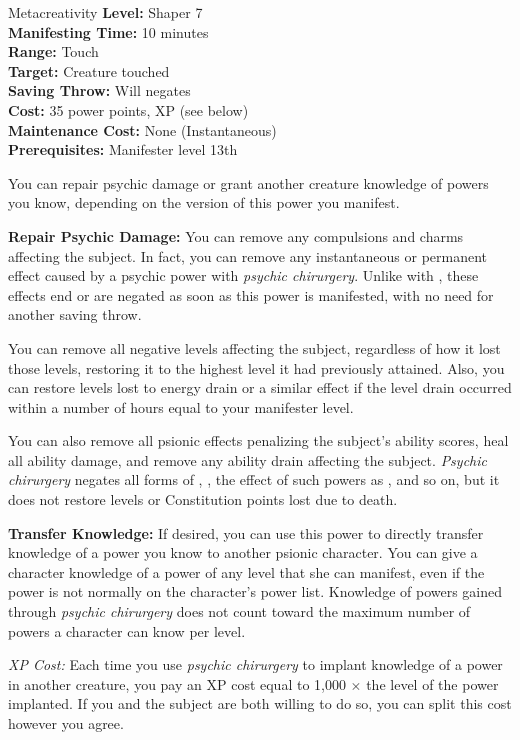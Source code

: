 {Metacreativity}
{
	\textbf{Level:}
	Shaper 7\\
	\textbf{Manifesting Time:}
	10 minutes\\
	\textbf{Range:}
	Touch\\
	\textbf{Target:}
	Creature touched\\
	\textbf{Saving Throw:}
	Will negates\\
	\textbf{Cost:}
	35 power points, XP (see below)\\
	\textbf{Maintenance Cost:}
	None (Instantaneous)\\
	\textbf{Prerequisites:}
	Manifester level 13th\\
}
{
	You can repair psychic damage or grant another creature knowledge of powers you know, depending on the version of this power you manifest.

	\textbf{Repair Psychic Damage:} You can remove any compulsions and charms affecting the subject. In fact, you can remove any instantaneous or permanent effect caused by a psychic power with \emph{psychic chirurgery}. Unlike with , these effects end or are negated as soon as this power is manifested, with no need for another saving throw.

	You can remove all negative levels affecting the subject, regardless of how it lost those levels, restoring it to the highest level it had previously attained. Also, you can restore levels lost to energy drain or a similar effect if the level drain occurred within a number of hours equal to your manifester level.

	You can also remove all psionic effects penalizing the subject's ability scores, heal all ability damage, and remove any ability drain affecting the subject. \emph{Psychic chirurgery} negates all forms of , , the effect of such powers as , and so on, but it does not restore levels or Constitution points lost due to death.

	\textbf{Transfer Knowledge:} If desired, you can use this power to directly transfer knowledge of a power you know to another psionic character. You can give a character knowledge of a power of any level that she can manifest, even if the power is not normally on the character's power list. Knowledge of powers gained through \emph{psychic chirurgery} does not count toward the maximum number of powers a character can know per level.

	\textit{XP Cost:} Each time you use \emph{psychic chirurgery} to implant knowledge of a power in another creature, you pay an XP cost equal to 1,000 $\times$ the level of the power implanted. If you and the subject are both willing to do so, you can split this cost however you agree.
}